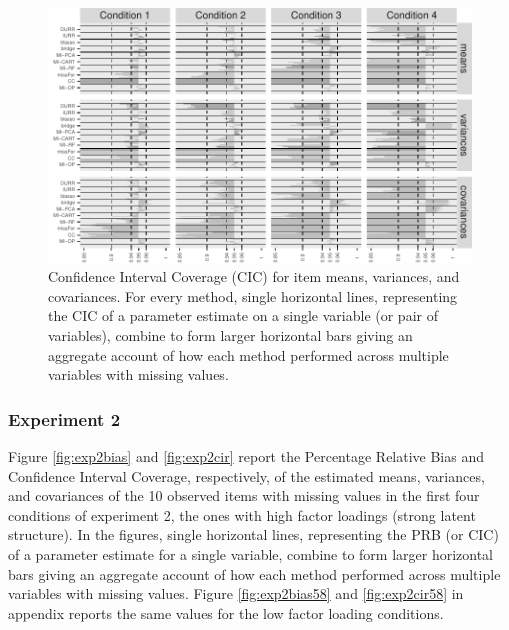 \begin{figure}[p]
	\includegraphics{../../output/graphs/exp1_CI.pdf}
\caption{Confidence Interval Coverage (CIC) for item means, variances, and covariances. 
	For every method, single horizontal lines, representing the CIC of a parameter estimate on 
	a single variable (or pair of variables), combine to form larger horizontal bars giving an 
	aggregate account of how each method performed across multiple variables with missing values.
}
\label{fig:exp1cir}
\end{figure}
	
\FloatBarrier %

\subsubsection{Experiment 2}

	Figure \ref{fig:exp2bias} and \ref{fig:exp2cir} report the Percentage Relative Bias and Confidence Interval 
	Coverage, respectively, of the estimated means, variances, and covariances of the 10 observed items with
	missing values in the first four conditions of experiment 2, the ones with high factor loadings (strong 
	latent structure).
	In the figures, single horizontal lines, representing the PRB (or CIC) of a parameter estimate for a single variable, 
	combine to form larger horizontal bars giving an aggregate account of how each method performed across
	multiple variables with missing values.
	Figure \ref{fig:exp2bias58} and \ref{fig:exp2cir58} in appendix reports the same values for the low 
	factor loading conditions.

